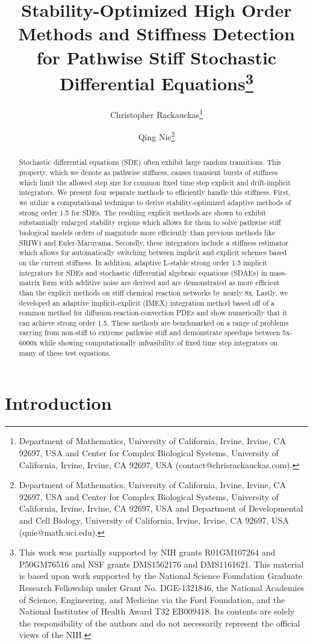 \documentclass{article}
\title{Stability-Optimized High Order Methods and Stiffness Detection for
	Pathwise Stiff Stochastic Differential Equations\thanks{
			This work was partially supported by NIH grants R01GM107264 and P50GM76516
			and NSF grants DMS1562176 and DMS1161621. This material is based upon
			work supported by the National Science Foundation Graduate Research
			Fellowship under Grant No. DGE-1321846, the National Academies of
			Science, Engineering, and Medicine via the Ford Foundation, and the
			National Institutes of Health Award T32 EB009418. Its contents are
			solely the responsibility of the authors and do not necessarily represent
			the official views of the NIH.}}
\author{Christopher Rackauckas\thanks{Department of Mathematics, University of California, Irvine, Irvine,
		CA 92697, USA and Center for Complex Biological Systems, University
		of California, Irvine, Irvine, CA 92697, USA (contact@chrisrackauckas.com).}
	\and Qing Nie\thanks{Department of Mathematics, University of California, Irvine, Irvine,
		CA 92697, USA and Center for Complex Biological Systems, University
		of California, Irvine, Irvine, CA 92697, USA and Department of Developmental
		and Cell Biology, University of California, Irvine, Irvine, CA 92697,
		USA (qnie@math.uci.edu).}}
\begin{document}
	
\maketitle

\begin{abstract}
	Stochastic differential equations (SDE) often exhibit large random
	transitions. This property, which we denote as pathwise stiffness,
	causes transient bursts of stiffness which limit the allowed step
	size for common fixed time step explicit and drift-implicit integrators.
	We present four separate methods to efficiently handle this stiffness.
	First, we utilize a computational technique to derive stability-optimized
	adaptive methods of strong order 1.5 for SDEs. The resulting explicit
	methods are shown to exhibit substantially enlarged stability regions
	which allows for them to solve pathwise stiff biological models orders
	of magnitude more efficiently than previous methods like SRIW1 and
	Euler-Maruyama. Secondly, these integrators include a stiffness estimator
	which allows for automatically switching between implicit and explicit
	schemes based on the current stiffness. In addition, adaptive L-stable
	strong order 1.5 implicit integrators for SDEs and stochastic differential
	algebraic equations (SDAEs) in mass-matrix form with additive noise
	are derived and are demonstrated as more efficient than the explicit
	methods on stiff chemical reaction networks by nearly 8x. Lastly,
	we developed an adaptive implicit-explicit (IMEX) integration method
	based off of a common method for diffusion-reaction-convection PDEs
	and show numerically that it can achieve strong order 1.5. These methods
	are benchmarked on a range of problems varying from non-stiff to extreme
	pathwise stiff and demonstrate speedups between 5x-6000x while showing
	computationally infeasibility of fixed time step integrators on many
	of these test equations.
\end{abstract}

\section{Introduction}
\end{document}
